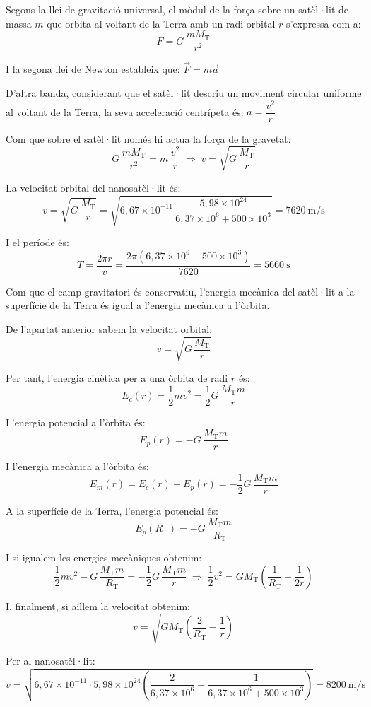 \begin{solapartat}
 Segons la llei de gravitació universal, el mòdul de la força sobre un satèl·lit de massa $m$ que orbita al voltant de la Terra amb un radi orbital $r$ s'expressa com a:
\[ F = G\,\frac{m M_\mathrm{T}}{r^2} \]

 I la segona llei de Newton estableix que: $\vec{F} = m\vec{a}$

 D'altra banda, considerant que el satèl·lit descriu un moviment circular uniforme al voltant de la Terra, la seva acceleració centrípeta és: $a = \dfrac{v^2}{r}$

 Com que sobre el satèl·lit només hi actua la força de la gravetat:
\[ G\,\frac{m M_\mathrm{T}}{r^2} = m\,\frac{v^2}{r} \;\Rightarrow\; v = \sqrt{G\,\frac{M_\mathrm{T}}{r}} \]

 La velocitat orbital del nanosatèl·lit és:
\[ v = \sqrt{G\,\frac{M_\mathrm{T}}{r}} = \sqrt{6,67\times 10^{-11}\,\frac{5,98\times 10^{24}}{6,37\times 10^{6} + 500\times 10^{3}}} = 7620\ \mathrm{m/s} \]

 I el període és:
\[ T = \frac{2\pi r}{v} = \frac{2\pi(6,37\times 10^{6} + 500\times 10^{3})}{7620} = 5660\ \mathrm{s} \]
\end{solapartat}

\begin{solapartat}
 Com que el camp gravitatori és conservatiu, l'energia mecànica del satèl·lit a la superfície de la Terra és igual a l'energia mecànica a l'òrbita.

De l'apartat anterior sabem la velocitat orbital:
\[ v = \sqrt{G\,\frac{M_\mathrm{T}}{r}} \]

 Per tant, l'energia cinètica per a una òrbita de radi $r$ és:
\[ E_c(r) = \frac{1}{2}mv^2 = \frac{1}{2}G\,\frac{M_\mathrm{T} m}{r} \]

 L'energia potencial a l'òrbita és:
\[ E_p(r) = -G\,\frac{M_\mathrm{T} m}{r} \]

 I l'energia mecànica a l'òrbita és:
\[ E_m(r) = E_c(r) + E_p(r) = -\frac{1}{2}G\,\frac{M_\mathrm{T} m}{r} \]

 A la superfície de la Terra, l'energia potencial és:
\[ E_p(R_\mathrm{T}) = -G\,\frac{M_\mathrm{T} m}{R_\mathrm{T}} \]

I si igualem les energies mecàniques obtenim:
\[ \frac{1}{2}mv^2 - G\,\frac{M_\mathrm{T} m}{R_\mathrm{T}} = -\frac{1}{2}G\,\frac{M_\mathrm{T} m}{r} \;\Rightarrow\; \frac{1}{2}v^2 = G M_\mathrm{T}\left(\frac{1}{R_\mathrm{T}} - \frac{1}{2r}\right) \]

 I, finalment, si aïllem la velocitat obtenim:
\[ v = \sqrt{G M_\mathrm{T}\left(\frac{2}{R_\mathrm{T}} - \frac{1}{r}\right)} \]

 Per al nanosatèl·lit:
\[ v = \sqrt{6,67\times 10^{-11}\cdot 5,98\times 10^{24}\left(\frac{2}{6,37\times 10^{6}} - \frac{1}{6,37\times 10^{6} + 500\times 10^{3}}\right)} = 8200\ \mathrm{m/s} \]
\end{solapartat}
